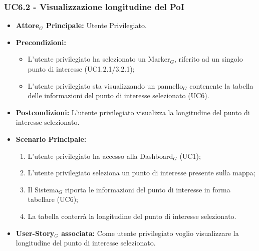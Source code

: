\documentclass[10pt]{article}
\begin{document}
\begin{justify}
 \subsubsection{\textbf{UC6.2 - Visualizzazione longitudine del PoI}}
 \begin{itemize}
     \item \textbf{Attore$_G$ Principale:} Utente Privilegiato.
     \item \textbf{Precondizioni:}
       \begin{itemize}
    	        \item L'utente privilegiato ha selezionato un Marker$_G$, riferito ad un singolo punto di interesse (UC1.2.1/3.2.1);
          \item L'utente privilegiato sta visualizzando un pannello$_G$ contenente la tabella delle informazioni del punto di interesse selezionato (UC6).
       \end{itemize}
     \item \textbf{Postcondizioni:} L'utente privilegiato visualizza la longitudine del punto di interesse selezionato.
     \item \textbf{Scenario Principale:}
        \begin{enumerate}
            \item L'utente privilegiato ha accesso alla Dashboard$_G$ (UC1);
            \item L'utente privilegiato seleziona un punto di interesse presente sulla mappa;
            \item Il Sistema$_G$ riporta le informazioni del punto di interesse in forma tabellare (UC6);
            \item La tabella conterrà la longitudine del punto di interesse selezionato.
        \end{enumerate}
     \item \textbf{User-Story$_G$ associata:} Come utente privilegiato voglio visualizzare la longitudine del punto di interesse selezionato. 
 \end{itemize}

\end{justify}
\end{document}
